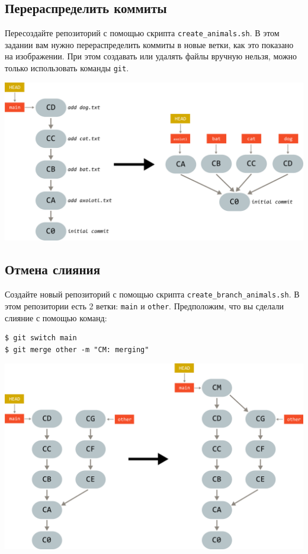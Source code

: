 \documentclass{article}
\begin{document}
\subsection{Перераспределить коммиты}
Пересоздайте репозиторий с помощью скрипта \texttt{create\_animals.sh}. В этом задании вам нужно перераспределить коммиты в новые ветки, как это показано на изображении. При этом создавать или удалять файлы вручную нельзя, можно только использовать команды \texttt{git}.
\begin{center}
\includegraphics[scale=0.8]{../images/rearrange_animals.png}
\end{center}


\subsection{Отмена слияния}
Создайте новый репозиторий с помощью скрипта \texttt{create\_branch\_animals.sh}. В этом репозитории есть 2 ветки: \texttt{main} и \texttt{other}. Предположим, что вы сделали слияние с помощью команд:
\begin{lstlisting}[style=csMiptBash]
$ git switch main
$ git merge other -m "CM: merging"
\end{lstlisting}

\begin{center}
\includegraphics[scale=0.8]{../images/branch_animals_merge.png}
\end{center}
\end{document}
